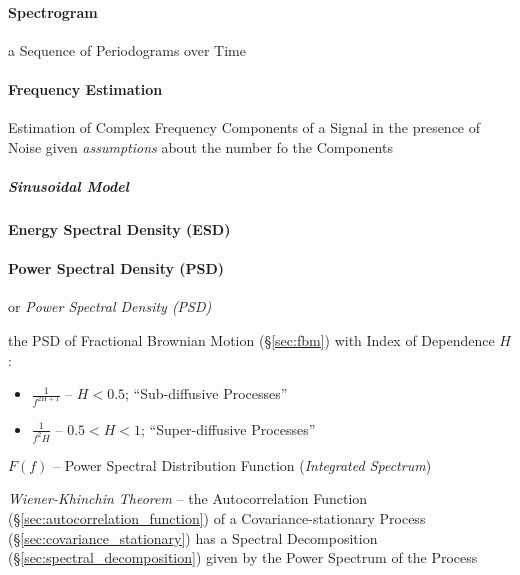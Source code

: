 \paragraph{Spectrogram}\label{sec:spectrogram}\hfill

a Sequence of Periodograms over Time



\paragraph{Frequency Estimation}\label{sec:frequency_estimation}\hfill

Estimation of Complex Frequency Components of a Signal in the presence of Noise
given \emph{assumptions} about the number fo the Components



\subparagraph{Sinusoidal Model}\label{sec:sinusoidal_model}\hfill



\paragraph{Energy Spectral Density (ESD)}\label{sec:esd}\hfill

\paragraph{Power Spectral Density (PSD)}\label{sec:psd}\hfill

or \emph{Power Spectral Density (PSD)}

the PSD of Fractional Brownian Motion (\S\ref{sec:fbm}) with Index of Dependence
$H$:
\begin{itemize}
  \item $\frac{1}{f^{2H+1}}$ -- $H < 0.5$; ``Sub-diffusive Processes''
  \item $\frac{1}{f^2H}$ -- $0.5 < H < 1$; ``Super-diffusive Processes''
\end{itemize}

$F(f)$ -- Power Spectral Distribution Function (\emph{Integrated Spectrum})

\emph{Wiener-Khinchin Theorem} -- the Autocorrelation Function
(\S\ref{sec:autocorrelation_function}) of a Covariance-stationary Process
(\S\ref{sec:covariance_stationary}) has a Spectral Decomposition
(\S\ref{sec:spectral_decomposition}) given by the Power Spectrum of the Process



